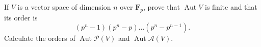 If $V$ is a vector space of dimension $n$ over $\mathbf{F}_p$, prove that $\operatorname{Aut} V$ is finite and that its order is
$$(p^n - 1)(p^n - p) \ldots (p^n - p^{n-1}).$$
Calculate the orders of $\operatorname{Aut} \mathcal{P}(V)$ and $\operatorname{Aut} \mathcal{A}(V)$.

